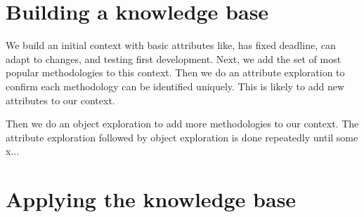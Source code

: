 \section{Building a knowledge base}
We build an initial context with basic attributes like, has fixed deadline, can adapt to changes, and testing first development.
Next, we add the set of most popular methodologies to this context.
Then we do an attribute exploration to confirm each methodology can be identified uniquely.
This is likely to add new attributes to our context.

Then we do an object exploration to add more methodologies to our context.
The attribute exploration followed by object exploration is done repeatedly until some x...

\section{Applying the knowledge base}

